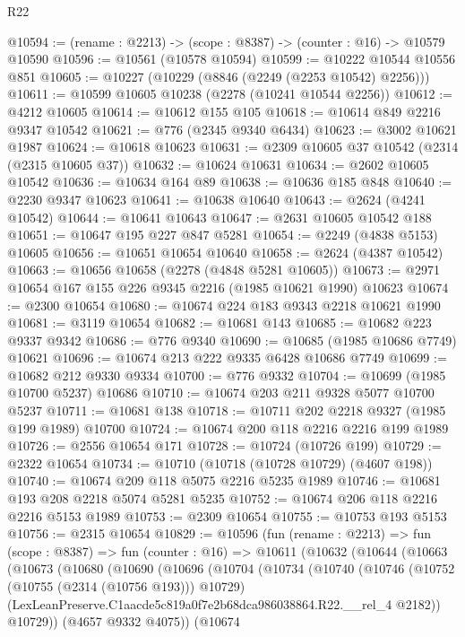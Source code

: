 \begin{lexlean}{R22}
\begin{coremodule}
@10594 := (rename : @2213) -> (scope : @8387) -> (counter : @16) -> @10579 @10590
@10596 := @10561 (@10578 @10594)
@10599 := @10222 @10544 @10556 @851
@10605 := @10227 (@10229 (@8846 (@2249 (@2253 @10542) @2256)))
@10611 := @10599 @10605 @10238 (@2278 (@10241 @10544 @2256))
@10612 := @4212 @10605
@10614 := @10612 @155 @105
@10618 := @10614 @849 @2216 @9347 @10542
@10621 := @776 (@2345 @9340 @6434)
@10623 := @3002 @10621 @1987
@10624 := @10618 @10623
@10631 := @2309 @10605 @37 @10542 (@2314 (@2315 @10605 @37))
@10632 := @10624 @10631
@10634 := @2602 @10605 @10542
@10636 := @10634 @164 @89
@10638 := @10636 @185 @848
@10640 := @2230 @9347 @10623
@10641 := @10638 @10640
@10643 := @2624 (@4241 @10542)
@10644 := @10641 @10643
@10647 := @2631 @10605 @10542 @188
@10651 := @10647 @195 @227 @847 @5281
@10654 := @2249 (@4838 @5153) @10605
@10656 := @10651 @10654 @10640
@10658 := @2624 (@4387 @10542)
@10663 := @10656 @10658 (@2278 (@4848 @5281 @10605))
@10673 := @2971 @10654 @167 @155 @226 @9345 @2216 (@1985 @10621 @1990) @10623
@10674 := @2300 @10654
@10680 := @10674 @224 @183 @9343 @2218 @10621 @1990
@10681 := @3119 @10654
@10682 := @10681 @143
@10685 := @10682 @223 @9337 @9342
@10686 := @776 @9340
@10690 := @10685 (@1985 @10686 @7749) @10621
@10696 := @10674 @213 @222 @9335 @6428 @10686 @7749
@10699 := @10682 @212 @9330 @9334
@10700 := @776 @9332
@10704 := @10699 (@1985 @10700 @5237) @10686
@10710 := @10674 @203 @211 @9328 @5077 @10700 @5237
@10711 := @10681 @138
@10718 := @10711 @202 @2218 @9327 (@1985 @199 @1989) @10700
@10724 := @10674 @200 @118 @2216 @2216 @199 @1989
@10726 := @2556 @10654 @171
@10728 := @10724 (@10726 @199)
@10729 := @2322 @10654
@10734 := @10710 (@10718 (@10728 @10729) (@4607 @198))
@10740 := @10674 @209 @118 @5075 @2216 @5235 @1989
@10746 := @10681 @193 @208 @2218 @5074 @5281 @5235
@10752 := @10674 @206 @118 @2216 @2216 @5153 @1989
@10753 := @2309 @10654
@10755 := @10753 @193 @5153
@10756 := @2315 @10654
@10829 := @10596
    (fun (rename : @2213) =>
    fun (scope : @8387) =>
    fun (counter : @16) =>
    @10611
      (@10632
        (@10644
          (@10663
            (@10673
              (@10680
                (@10690
                  (@10696
                    (@10704
                      (@10734
                        (@10740
                          (@10746
                            (@10752 (@10755 (@2314 (@10756 @193))) @10729)
                            (LexLeanPreserve.C1aacde5c819a0f7e2b68dca986038864.R22.__rel_4 @2182))
                          @10729))
                      (@4657 @9332 @4075))
                    (@10674

\end{coremodule}
\end{lexlean}
